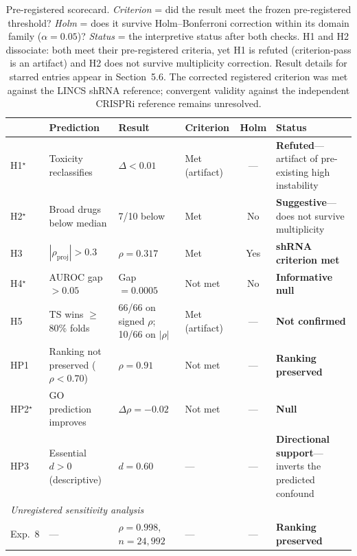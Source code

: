 \documentclass[11pt]{article}
\begin{document}
\begin{table}[t]
\centering
\caption{Pre-registered scorecard.
\emph{Criterion} = did the result meet the frozen pre-registered
threshold?
\emph{Holm} = does it survive Holm--Bonferroni correction within its
domain family ($\alpha = 0.05$)?
\emph{Status} = the interpretive status after both checks.
H1 and H2 dissociate: both meet their pre-registered criteria, yet H1
is refuted (criterion-pass is an artifact) and H2 does not survive
multiplicity correction.
Result details for starred entries appear in Section~5.6.
The corrected registered criterion was met against the LINCS shRNA reference;
convergent validity against the independent CRISPRi reference remains
unresolved.}
\label{tab:scorecard}
\small
\begin{tabular}{@{}lp{2.7cm}p{3.0cm}p{1.7cm}cp{3.3cm}@{}}
\toprule
 & Prediction & Result & Criterion & Holm & Status \\
\midrule
H1$^\star$ & Toxicity reclassifies & $\Delta < 0.01$ & Met (artifact) & --- & \textbf{Refuted}---artifact of pre-existing high instability \\
H2$^\star$ & Broad drugs below median & 7/10 below & Met & No & \textbf{Suggestive}---does not survive multiplicity \\
H3 & $|\rho_{\text{proj}}| > 0.3$ & $\rho = 0.317$ & Met & Yes & \textbf{shRNA criterion met} \\
H4$^\star$ & AUROC gap $> 0.05$ & Gap $= 0.0005$ & Not met & No & \textbf{Informative null} \\
H5 & TS wins $\geq$80\% folds & 66/66 on signed $\rho$; 10/66 on $|\rho|$ & Met (artifact) & --- & \textbf{Not confirmed} \\
\midrule
HP1 & Ranking not preserved ($\rho < 0.70$) & $\rho = 0.91$ & Not met & --- & \textbf{Ranking preserved} \\
HP2$^\star$ & GO prediction improves & $\Delta\rho = -0.02$ & Not met & --- & \textbf{Null} \\
HP3 & Essential $d > 0$ (descriptive) & $d = 0.60$ & --- & --- & \textbf{Directional support}---inverts the predicted confound \\
\midrule
\multicolumn{6}{l}{\emph{Unregistered sensitivity analysis}}\\
Exp.~8 & --- & $\rho = 0.998$, $n = 24{,}992$ & --- & --- & \textbf{Ranking preserved} \\
\bottomrule
\end{tabular}
\end{table}
\end{document}
